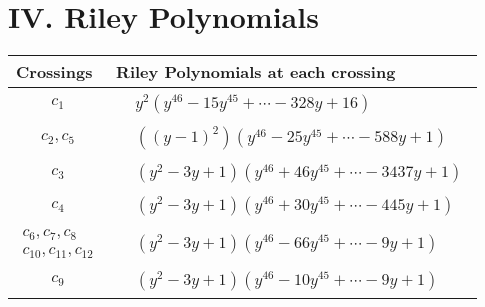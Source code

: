 \documentclass[1p]{elsarticle_modified}
\theoremstyle{definition}
\begin{document}
\centering \section*{ IV. Riley Polynomials}
\begin{tabular}{m{50pt}|m{274pt}}
Crossings & \hspace{64pt}Riley Polynomials at each crossing \\
\hline $$\begin{aligned}c_{1}\end{aligned}$$&$\begin{aligned}
&y^2(y^{46}-15 y^{45}+\cdots-328 y+16)
\end{aligned}$\\
\hline $$\begin{aligned}c_{2},c_{5}\end{aligned}$$&$\begin{aligned}
&((y-1)^2)(y^{46}-25 y^{45}+\cdots-588 y+1)
\end{aligned}$\\
\hline $$\begin{aligned}c_{3}\end{aligned}$$&$\begin{aligned}
&(y^2-3 y+1)(y^{46}+46 y^{45}+\cdots-3437 y+1)
\end{aligned}$\\
\hline $$\begin{aligned}c_{4}\end{aligned}$$&$\begin{aligned}
&(y^2-3 y+1)(y^{46}+30 y^{45}+\cdots-445 y+1)
\end{aligned}$\\
\hline $$\begin{aligned}c_{6},c_{7},c_{8}\\c_{10},c_{11},c_{12}\end{aligned}$$&$\begin{aligned}
&(y^2-3 y+1)(y^{46}-66 y^{45}+\cdots-9 y+1)
\end{aligned}$\\
\hline $$\begin{aligned}c_{9}\end{aligned}$$&$\begin{aligned}
&(y^2-3 y+1)(y^{46}-10 y^{45}+\cdots-9 y+1)
\end{aligned}$\\
\hline
\end{tabular}
\vskip 2pc
\end{document}

